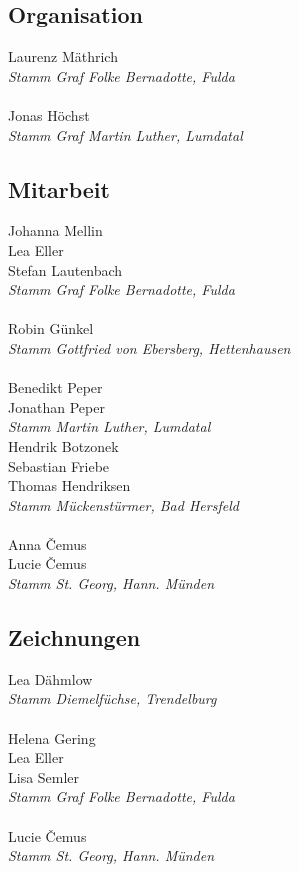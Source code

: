 \begin{centering}
\begin{multicols}{2}

\subsection*{Organisation}
Laurenz Mäthrich \\ \textit{Stamm Graf Folke Bernadotte, Fulda} \\ ~\\
Jonas Höchst \\ \textit{Stamm Graf Martin Luther, Lumdatal} \\

\subsection*{Mitarbeit}
Johanna Mellin \\ Lea Eller \\ Stefan Lautenbach \\ \textit{Stamm Graf Folke Bernadotte, Fulda} \\ ~\\
Robin Günkel \\ \textit{Stamm Gottfried von Ebersberg, Hettenhausen} \\ ~\\
Benedikt Peper \\ Jonathan Peper \\ \textit{Stamm Martin Luther, Lumdatal} \\
Hendrik Botzonek \\ Sebastian Friebe \\ Thomas Hendriksen \\ \textit{Stamm Mückenstürmer, Bad Hersfeld} \\ ~\\
Anna \v{C}emus \\ Lucie \v{C}emus \\ \textit{Stamm St. Georg, Hann. Münden} \\

\subsection*{Zeichnungen}
Lea Dähmlow \\ \textit{Stamm Diemelfüchse, Trendelburg} \\ ~\\
Helena Gering \\ Lea Eller \\ Lisa Semler \\ \textit{Stamm Graf Folke Bernadotte, Fulda} \\ ~\\
Lucie \v{C}emus \\ \textit{Stamm St. Georg, Hann. Münden} \\


\end{multicols}
\end{centering}
